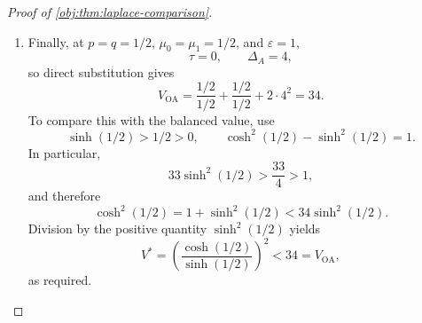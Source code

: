 \begin{proof}[Proof of \cref{obj:thm:laplace-comparison}]
\begin{enumerate}
\item Finally, at \(p=q=1/2\), \(\mu_0=\mu_1=1/2\), and \(\varepsilon=1\),
\[
\tau=0,\qquad \Delta_A=4,
\]
so direct substitution gives
\[
V_{\mathrm{OA}}
=
\frac{1/2}{1/2}+\frac{1/2}{1/2}
+2\cdot4^2
=34.
\]
To compare this with the balanced value, use
\[
\sinh(1/2)>1/2>0,
\qquad
\cosh^2(1/2)-\sinh^2(1/2)=1.
\]
In particular,
\[
33\sinh^2(1/2)>\frac{33}{4}>1,
\]
and therefore
\[
\cosh^2(1/2)
=
1+\sinh^2(1/2)
<
34\sinh^2(1/2).
\]
Division by the positive quantity \(\sinh^2(1/2)\) yields
\[
V^*
=
\left(\frac{\cosh(1/2)}{\sinh(1/2)}\right)^2
<34=V_{\mathrm{OA}},
\]
as required.
\end{enumerate}
\end{proof}
